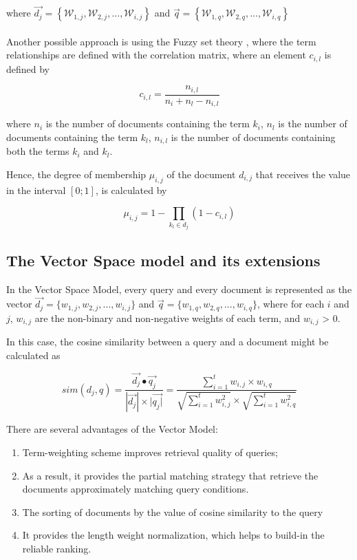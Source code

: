 \documentclass[paper=8.27in:11.69in, 12pt]{scrartcl}
\begin{document}
where \( \vec{d_{j}} = \left \{ \mathcal{W}_{1,j}, \mathcal{W}_{2,j}, ... ,\mathcal{W}_{i,j} \right \} \) and \( \vec{q} = \left \{ \mathcal{W}_{1,q}, \mathcal{W}_{2,q}, ... ,\mathcal{W}_{i,q} \right \} \)
\\
\\
Another possible approach is using the Fuzzy set theory \cite{ogawa1991fuzzy}, where the term relationships are defined with the correlation matrix, where an element \(c_{i,l}\) is defined by

\[c_{i, l} = \frac{n_{i, l}}{n_{i}+n_{l}-n_{i, l}} \]

where \(n_{i}\) is the number of documents containing the term \(k_{i}\), \(n_{l}\) is the number of documents containing the term \(k_{l}\), \(n_{i, l}\) is the number of documents containing both the terms \(k_{i}\) and \(k_{l}\).

Hence, the degree of membership \( \mu_{i, j} \) of the document \( d_{i, j} \) that receives the value in the interval \( \left [  0; 1 \right ] \), is calculated by

\[ \mu_{i, j} = 1 - \prod_{k_{l} \in d_{j}} \left ( 1 - c_{i , l}  \right ) \]

\subsection{The Vector Space model and its extensions}

In the Vector Space Model, every query and every document is represented as the vector \( \vec{d_{j}} = \{ w_{1, j}, w_{2, j}, ... , w_{i, j} \} \) and \( \vec{q} = \{ w_{1, q}, w_{2, q}, ... , w_{i, q} \} \), where for each \(i\) and \(j\), \( w_{i, j} \) are the non-binary and non-negative weights of each term, and \( w_{i, j} \) > 0.

In this case, the cosine similarity between a query and a document might be calculated as 

\[sim(d_{j},q) = \frac{\vec{d_{j}} \bullet \vec{q_{j}}}{|\vec{d_{j}}| \times |\vec{q_{j}|}} = \frac{\sum_{i=1}^{t} w_{i,j} \times w_{i,q}}{\sqrt{\sum_{i=1}^{t} w^{2}_{i,j}} \times \sqrt{\sum_{i=1}^{t} w^{2}_{i,q}}}\]

There are several advantages of the Vector Model:

\begin{enumerate}

\item Term-weighting scheme improves retrieval quality of queries;

\item As a result, it provides the partial matching strategy that retrieve the documents approximately matching query conditions.

\item The sorting of documents by the value of cosine similarity to the query

\item It provides the length weight normalization, which helps to build-in the reliable ranking.

\end{enumerate}
\end{document}
